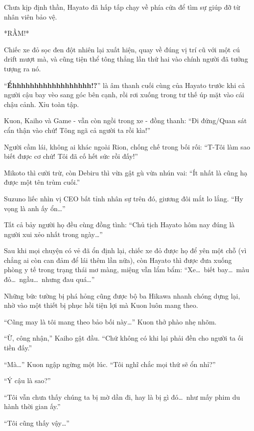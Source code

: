 \documentclass[../main.tex]{subfiles}
\begin{document}
Chưa kịp định thần, Hayato đã hấp tấp chạy về phía cửa để tìm sự giúp đỡ từ nhân viên bảo vệ.

*RẦM!*


Chiếc xe đỏ sọc đen đột nhiên lại xuất hiện, quay về đúng vị trí cũ với một cú drift mượt mà, và cũng tiện thể tông thẳng lần thứ hai vào chính người đã tưởng tượng ra nó.

``\textbf{Ểhhhhhhhhhhhhhhhhhh!?}'' là âm thanh cuối cùng của Hayato trước khi cả người cậu bay vèo sang góc bên cạnh, rồi rơi xuống trong tư thế úp mặt vào cái chậu cảnh. Xỉu toàn tập.

Kuon, Kaiho và Game - vẫn còn ngồi trong xe - đồng thanh: ``Đi đứng/Quan sát cẩn thận vào chứ! Tông ngã cả người ta rồi kìa!''

Người cầm lái, không ai khác ngoài Rion, chống chế trong bối rối: ``T-Tôi làm sao biết được cơ chứ! Tôi đã cố hết sức rồi đấy!''

Mikoto thì cười trừ, còn Debiru thì vừa gật gù vừa nhún vai: ``Ít nhất là cũng hạ được một tên trùm cuối.''

Suzuno liếc nhìn vị CEO bất tỉnh nhân sự trên đó, giương đôi mắt lo lắng. ``Hy vọng là anh ấy ổn\dots''

Tất cả bảy người họ đều cùng đồng tình: ``Chủ tịch Hayato hôm nay đúng là người xui xẻo nhất trong ngày\dots''

\ct

Sau khi mọi chuyện có vẻ đã ổn định lại, chiếc xe đỏ được họ để yên một chỗ (vì chẳng ai còn can đảm để lái thêm lần nữa), còn Hayato thì được đưa xuống phòng y tế trong trạng thái mơ màng, miệng vẫn lẩm bẩm: ``Xe\dots\ biết bay\dots\ màu đỏ\dots\ ngầu\dots\ nhưng đau quá\dots''

Những bức tường bị phá hỏng cũng được bộ ba Hikawa nhanh chóng dựng lại, nhờ vào một thiết bị phục hồi tiện lợi mà Kuon luôn mang theo.

``Cũng may là tôi mang theo bảo bối này\dots'' Kuon thở phào nhẹ nhõm.

``Ừ, công nhận,'' Kaiho gật đầu. ``Chứ không có khi lại phải đền cho người ta ối tiền đấy.''

``Mà\dots'' Kuon ngập ngừng một lúc. ``Tôi nghĩ chắc mọi thứ sẽ ổn nhỉ?''

``Ý cậu là sao?''

``Tôi vẫn chưa thấy chúng ta bị mờ dần đi, hay là bị gì đó\dots\ như mấy phim du hành thời gian ấy.''

``Tôi cũng thấy vậy\dots''
\end{document}
